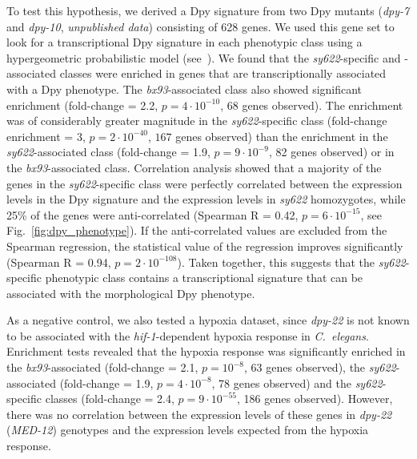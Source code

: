 \documentclass[10pt, twocolumn]{article}
\newcommand{\cel}{\emph{C.~elegans}}
\newcommand{\gene}[1]{\mbox{\emph{#1}}}
\newcommand{\dpy}{\gene{dpy-22} (\emph{MED-12})}
\begin{document}
To test this hypothesis, we derived a Dpy signature from two Dpy mutants
(\gene{dpy-7} and \gene{dpy-10}, \emph{unpublished data}) consisting of 628
genes. We used this gene set to look for a transcriptional Dpy signature in each
phenotypic class using a hypergeometric probabilistic model
(see~). We found that the \emph{sy622}-specific and
-associated classes were enriched in genes that are transcriptionally associated
with a Dpy phenotype. The \emph{bx93}-associated class also showed significant
enrichment (fold-change = 2.2, $p=4\cdot10^{-10}$, 68 genes observed). The
enrichment was of considerably greater magnitude in the \emph{sy622}-specific
class (fold-change enrichment = 3, $p=2\cdot 10^{-40}$, $167$ genes observed)
than the enrichment in the \emph{sy622}-associated class (fold-change = 1.9,
$p=9\cdot10^{-9}$, 82 genes observed) or in the \emph{bx93}-associated class.
Correlation analysis showed that a majority of the genes in the
\emph{sy622}-specific class were perfectly correlated between the expression
levels in the Dpy signature and the expression levels in \emph{sy622}
homozygotes, while 25\% of the genes were anti-correlated (Spearman R = 0.42,
$p=6\cdot10^{-15}$, see Fig.~\ref{fig:dpy_phenotype}). If the anti-correlated
values are excluded from the Spearman regression, the statistical value of the
regression improves significantly (Spearman R = 0.94, $p=2\cdot10^{-108}$).
Taken together, this suggests that the \emph{sy622}-specific phenotypic class
contains a transcriptional signature that can be associated with the
morphological Dpy phenotype.

As a negative control, we also tested a hypoxia dataset, since \emph{dpy-22} is
not known to be associated with the \gene{hif-1}-dependent hypoxia response in
\cel{}. Enrichment tests revealed that the hypoxia response was significantly
enriched in the \emph{bx93}-associated (fold-change = 2.1, $p=10^{-8}$, 63 genes
observed), the \emph{sy622}-associated (fold-change = 1.9, $p=4\cdot10^{-8}$, 78
genes observed) and the \emph{sy622}-specific classes (fold-change = 2.4,
$p=9\cdot10^{-55}$, 186 genes observed). However, there was no correlation
between the expression levels of these genes in \dpy{} genotypes and the
expression levels expected from the hypoxia response.
\end{document}
